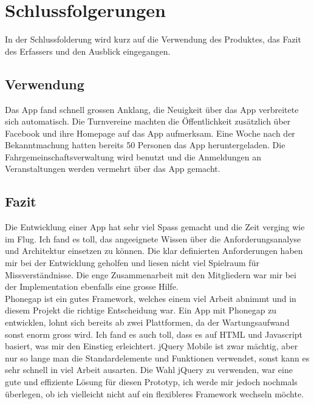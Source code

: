 %
%

\chapter{Schlussfolgerungen}\label{chap.Schlussfolgerungen}
In der Schlussfolderung wird kurz auf die Verwendung des Produktes, das Fazit des Erfassers und den Ausblick eingegangen.

\section{Verwendung}\label{fazit_verwendung}
Das App fand schnell grossen Anklang, die Neuigkeit über das App verbreitete sich automatisch. Die Turnvereine machten die Öffentlichkeit zusätzlich über Facebook und ihre Homepage auf das App aufmerksam. Eine Woche nach der Bekanntmachung hatten bereits 50 Personen das App heruntergeladen. Die Fahrgemeinschaftsverwaltung wird benutzt und die Anmeldungen an Veranstaltungen werden vermehrt über das App gemacht.

\section{Fazit}\label{fazit}

Die Entwicklung einer App hat sehr viel Spass gemacht und die Zeit verging wie im Flug. Ich fand es toll, das angeeignete Wissen über die Anforderungsanalyse und Architektur einsetzen zu können. Die klar definierten Anforderungen haben mir bei der Entwicklung geholfen und liesen nicht viel Spielraum für Missverständnisse. Die enge Zusammenarbeit mit den Mitgliedern war mir bei der Implementation ebenfalls eine grosse Hilfe.\\

Phonegap ist ein gutes Framework, welches einem viel Arbeit abnimmt und in diesem Projekt die richtige Entscheidung war. Ein App mit Phonegap zu entwicklen, lohnt sich bereits ab zwei Plattformen, da der Wartungsaufwand sonst enorm gross wird. Ich fand es auch toll, dass es auf HTML und Javascript basiert, was mir den Einstieg erleichtert. jQuery Mobile ist zwar mächtig, aber nur so lange man die Standardelemente und Funktionen verwendet, sonst kann es sehr schnell in viel Arbeit ausarten. Die Wahl jQuery zu verwenden, war eine gute und effiziente Lösung für diesen Prototyp, ich werde mir jedoch nochmals überlegen, ob ich vielleicht nicht auf ein flexibleres Framework wechseln möchte.\\


